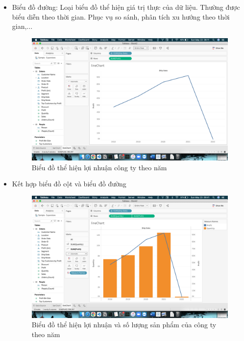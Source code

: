\documentclass[a4paper, 12pt]{article}
\begin{document}
\begin{itemize}
    \item Biểu đồ đường: Loại biểu đồ thể hiện giá trị thực của dữ liệu. Thường được biểu diễn theo thời gian. Phục vụ so sánh, phân tích xu hướng theo thời gian,...
    \begin{figure}[H]
        \begin{center}
            \includegraphics[scale=0.3]{img/lineChart.png}
            \caption{Biểu đồ thể hiện lợi nhuận công ty theo năm}
        \end{center}
    \end{figure}

    \item Kết hợp biểu đồ cột và biểu đồ đường
    \begin{figure}[H]
        \begin{center}
            \includegraphics[scale=0.3]{img/lineBar.png}
            \caption{Biểu đồ thể hiện lợi nhuận và số lượng sản phẩm của công ty theo năm}
        \end{center}
    \end{figure}


\end{itemize}
\end{document}
